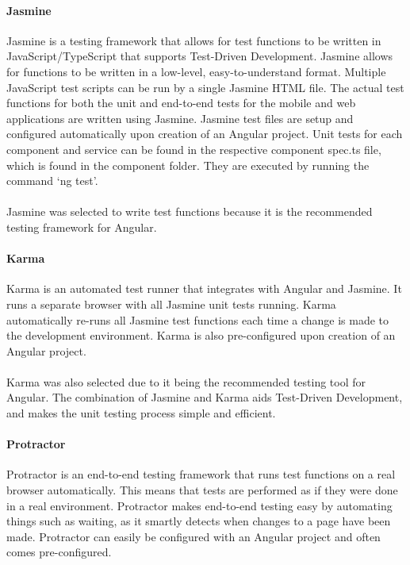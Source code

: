 \documentclass[a4paper, 11pt]{article}
\begin{document}
            \paragraph{Jasmine}
            Jasmine is a testing framework that allows for test functions to be written in JavaScript/TypeScript that supports Test-Driven Development. Jasmine allows for functions to be written in a low-level, easy-to-understand format. Multiple JavaScript test scripts can be run by a single Jasmine HTML file. The actual test functions for both the unit and end-to-end tests for the mobile and web applications are written using Jasmine. Jasmine test files are setup and configured automatically upon creation of an Angular project. Unit tests for each component and service can be found in the respective component spec.ts file, which is found in the component folder. They are executed by running the command ‘ng test’.
            \paragraph{}
            Jasmine was selected to write test functions because it is the recommended testing framework for Angular.
            
            \paragraph{Karma}
            Karma is an automated test runner that integrates with Angular and Jasmine. It runs a separate browser with all Jasmine unit tests running. Karma automatically re-runs all Jasmine test functions each time a change is made to the development environment. Karma is also pre-configured upon creation of an Angular project.
            \paragraph{}
            Karma was also selected due to it being the recommended testing tool for Angular. The combination of Jasmine and Karma aids Test-Driven Development, and makes the unit testing process simple and efficient.
            
            \paragraph{Protractor}
            Protractor is an end-to-end testing framework that runs test functions on a real browser automatically. This means that tests are performed as if they were done in a real environment. Protractor makes end-to-end testing easy by automating things such as waiting, as it smartly detects when changes to a page have been made. Protractor can easily be configured with an Angular project and often comes pre-configured.
\end{document}
